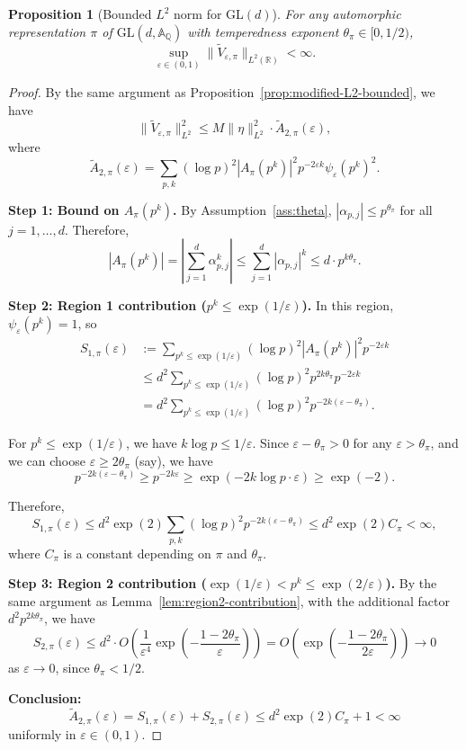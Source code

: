 ﻿\documentclass[12pt,a4paper]{article}
\newtheorem{proposition}[theorem]{Proposition}
\theoremstyle{definition}
\theoremstyle{remark}
\newcommand{\RR}{\mathbb{R}}
\begin{document}
\begin{proposition}[Bounded $L^2$ norm for GL$(d)$]\label{prop:GLd-L2-bounded}
For any automorphic representation $\pi$ of $\mathrm{GL}(d,\mathbb{A}_\mathbb Q)$ with temperedness exponent $\theta_\pi \in [0,1/2)$,
\[
  \sup_{\varepsilon \in (0,1)} \|\widetilde{V}_{\varepsilon,\pi}\|_{L^2(\RR)} < \infty.
\]
\end{proposition}

\begin{proof}
By the same argument as Proposition~\ref{prop:modified-L2-bounded}, we have
\[
  \|\widetilde{V}_{\varepsilon,\pi}\|_{L^2}^2 \leq M \|\eta\|_{L^2}^2 \cdot \widetilde{A}_{2,\pi}(\varepsilon),
\]
where
\[
  \widetilde{A}_{2,\pi}(\varepsilon) = \sum_{p,k} (\log p)^2 |A_\pi(p^k)|^2 p^{-2\varepsilon k} \psi_\varepsilon(p^k)^2.
\]

\textbf{Step 1: Bound on $A_\pi(p^k)$.}
By Assumption~\ref{ass:theta}, $|\alpha_{p,j}| \leq p^{\theta_\pi}$ for all $j = 1, \ldots, d$. Therefore,
\[
  |A_\pi(p^k)| = \left|\sum_{j=1}^d \alpha_{p,j}^k\right| \leq \sum_{j=1}^d |\alpha_{p,j}|^k \leq d \cdot p^{k\theta_\pi}.
\]

\textbf{Step 2: Region 1 contribution ($p^k \leq \exp(1/\varepsilon)$).}
In this region, $\psi_\varepsilon(p^k) = 1$, so
\begin{align*}
S_{1,\pi}(\varepsilon) &:= \sum_{p^k \leq \exp(1/\varepsilon)} (\log p)^2 |A_\pi(p^k)|^2 p^{-2\varepsilon k} \\
&\leq d^2 \sum_{p^k \leq \exp(1/\varepsilon)} (\log p)^2 p^{2k\theta_\pi} p^{-2\varepsilon k} \\
&= d^2 \sum_{p^k \leq \exp(1/\varepsilon)} (\log p)^2 p^{-2k(\varepsilon - \theta_\pi)}.
\end{align*}

For $p^k \leq \exp(1/\varepsilon)$, we have $k \log p \leq 1/\varepsilon$. Since $\varepsilon - \theta_\pi > 0$ for any $\varepsilon > \theta_\pi$, and we can choose $\varepsilon \geq 2\theta_\pi$ (say), we have
\[
  p^{-2k(\varepsilon - \theta_\pi)} \geq p^{-2k\varepsilon} \geq \exp(-2k\log p \cdot \varepsilon) \geq \exp(-2).
\]

Therefore,
\[
  S_{1,\pi}(\varepsilon) \leq d^2 \exp(2) \sum_{p,k} (\log p)^2 p^{-2k(\varepsilon - \theta_\pi)} \leq d^2 \exp(2) C_{\pi} < \infty,
\]
where $C_\pi$ is a constant depending on $\pi$ and $\theta_\pi$.

\textbf{Step 3: Region 2 contribution ($\exp(1/\varepsilon) < p^k \leq \exp(2/\varepsilon)$).}
By the same argument as Lemma~\ref{lem:region2-contribution}, with the additional factor $d^2 p^{2k\theta_\pi}$, we have
\[
  S_{2,\pi}(\varepsilon) \leq d^2 \cdot O\left(\frac{1}{\varepsilon^4} \exp\left(-\frac{1-2\theta_\pi}{\varepsilon}\right)\right) = O\left(\exp\left(-\frac{1-2\theta_\pi}{2\varepsilon}\right)\right) \to 0
\]
as $\varepsilon \to 0$, since $\theta_\pi < 1/2$.

\textbf{Conclusion:}
\[
  \widetilde{A}_{2,\pi}(\varepsilon) = S_{1,\pi}(\varepsilon) + S_{2,\pi}(\varepsilon) \leq d^2 \exp(2) C_\pi + 1 < \infty
\]
uniformly in $\varepsilon \in (0,1)$.
\end{proof}
\end{document}
